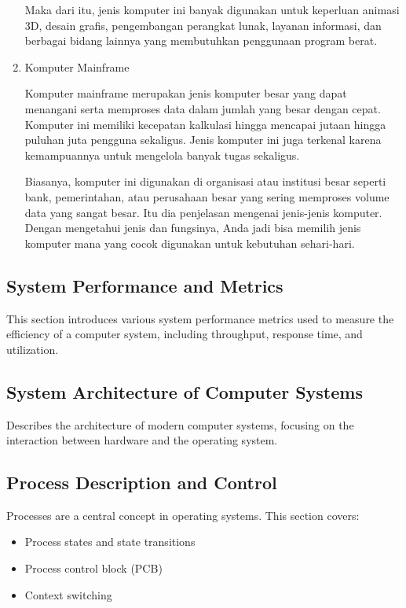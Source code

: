 \documentclass[12pt]{article}
\begin{document}
\begin{enumerate}
    Maka dari itu, jenis komputer ini banyak digunakan untuk keperluan animasi 3D, desain grafis, pengembangan perangkat lunak, layanan informasi, dan berbagai bidang lainnya yang membutuhkan penggunaan program berat. 

    \item Komputer Mainframe

    Komputer mainframe merupakan jenis komputer besar yang dapat menangani serta memproses data dalam jumlah yang besar dengan cepat. Komputer ini memiliki kecepatan kalkulasi hingga mencapai jutaan hingga puluhan juta pengguna sekaligus. Jenis komputer ini juga terkenal karena kemampuannya untuk mengelola banyak tugas sekaligus. 

    Biasanya, komputer ini digunakan di organisasi atau institusi besar seperti bank, pemerintahan, atau perusahaan besar yang sering memproses volume data yang sangat besar. Itu dia penjelasan mengenai jenis-jenis komputer. Dengan mengetahui jenis dan fungsinya, Anda jadi bisa memilih jenis komputer mana yang cocok digunakan untuk kebutuhan sehari-hari.
    
\end{enumerate}

\subsection{System Performance and Metrics}
This section introduces various system performance metrics used to measure the efficiency of a computer system, including throughput, response time, and utilization.

\subsection{System Architecture of Computer Systems}
Describes the architecture of modern computer systems, focusing on the interaction between hardware and the operating system.

\subsection{Process Description and Control}
Processes are a central concept in operating systems. This section covers:
\begin{itemize}
    \item Process states and state transitions
    \item Process control block (PCB)
    \item Context switching
\end{itemize}
\end{document}
